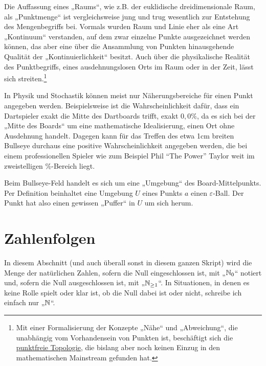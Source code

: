 \begin{bem}[Intuition]
    Die Auffassung eines „Raums“, wie z.B. der euklidische dreidimensionale Raum, als „Punktmenge“ ist vergleichsweise jung und trug wesentlich zur Entstehung des Mengenbegriffs bei. Vormals wurden Raum und Linie eher als eine Art „Kontinuum“ verstanden, auf dem zwar einzelne Punkte ausgezeichnet werden können, das aber eine über die Ansammlung von Punkten hinausgehende Qualität der „Kontinuierlichkeit“ besitzt. Auch über die physikalische Realität des Punktbegriffs, eines ausdehnungslosen Orts im Raum oder in der Zeit, lässt sich streiten.\footnote{Mit einer Formalisierung der Konzepte „Nähe“ und „Abweichung“, die unabhängig vom Vorhandensein von Punkten ist, beschäftigt sich die \href{https://en.wikipedia.org/wiki/Pointless_topology}{punktfreie Topologie}, die bislang aber noch keinen Einzug in den mathematischen Mainstream gefunden hat.}
    
    In Physik und Stochastik können meist nur Näherungsbereiche für einen Punkt angegeben werden. Beispielsweise ist die Wahrscheinlichkeit dafür, dass ein Dartspieler exakt die Mitte des Dartboards trifft, exakt $0{,}0\%$, da es sich bei der „Mitte des Boards“ um eine mathematische Idealisierung, einen Ort ohne Ausdehnung handelt. Dagegen kann für das Treffen des etwa 1cm breiten Bullseye durchaus eine positive Wahrscheinlichkeit angegeben werden, die bei einem professionellen Spieler wie zum Beispiel Phil ``The Power'' Taylor weit im zweistelligen \%-Bereich liegt.
    
    Beim Bullseye-Feld handelt es sich um eine „Umgebung“ des Board-Mittelpunkts. Per Definition beinhaltet eine Umgebung $U$ eines Punkts $a$ einen $\varepsilon$-Ball. Der Punkt hat also einen gewissen „Puffer“ in $U$ um sich herum.
\end{bem}





\section{Zahlenfolgen}


\begin{bem} \label{natzahlen}
    In diesem Abschnitt (und auch überall sonst in diesem ganzen Skript) wird die Menge der natürlichen Zahlen, sofern die Null eingeschlossen ist, mit „$\mathbb N_0$“ notiert und, sofern die Null ausgeschlossen ist, mit „$\mathbb N_{\ge 1}$“. In Situationen, in denen es keine Rolle spielt oder klar ist, ob die Null dabei ist oder nicht, schreibe ich einfach nur „$\mathbb N$“.
\end{bem}


